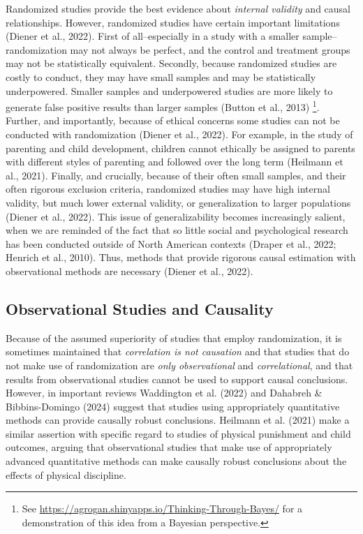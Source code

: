 \documentclass[
  letterpaper,
  DIV=11,
  numbers=noendperiod]{scrreprt}
\begin{document}
Randomized studies provide the best evidence about \emph{internal
validity} and causal relationships. However, randomized studies have
certain important limitations (Diener et al., 2022). First of
all--especially in a study with a smaller sample--randomization may not
always be perfect, and the control and treatment groups may not be
statistically equivalent. Secondly, because randomized studies are
costly to conduct, they may have small samples and may be statistically
underpowered. Smaller samples and underpowered studies are more likely
to generate false positive results than larger samples (Button et al.,
2013) \footnote{See
  \url{https://agrogan.shinyapps.io/Thinking-Through-Bayes/} for a
  demonstration of this idea from a Bayesian perspective.}. Further, and
importantly, because of ethical concerns some studies can not be
conducted with randomization (Diener et al., 2022). For example, in the
study of parenting and child development, children cannot ethically be
assigned to parents with different styles of parenting and followed over
the long term (Heilmann et al., 2021). Finally, and crucially, because
of their often small samples, and their often rigorous exclusion
criteria, randomized studies may have high internal validity, but much
lower external validity, or generalization to larger populations (Diener
et al., 2022). This issue of generalizability becomes increasingly
salient, when we are reminded of the fact that so little social and
psychological research has been conducted outside of North American
contexts (Draper et al., 2022; Henrich et al., 2010). Thus, methods that
provide rigorous causal estimation with observational methods are
necessary (Diener et al., 2022). 

\subsection{Observational Studies and
Causality}\label{observational-studies-and-causality}

Because of the assumed superiority of studies that employ randomization,
it is sometimes maintained that \emph{correlation is not causation} and
that studies that do not make use of randomization are \emph{only
observational} and \emph{correlational}, and that results from
observational studies cannot be used to support causal conclusions.
However, in important reviews Waddington et al. (2022) and Dahabreh \&
Bibbins-Domingo (2024) suggest that studies using appropriately
quantitative methods can provide causally robust conclusions. Heilmann
et al. (2021) make a similar assertion with specific regard to studies
of physical punishment and child outcomes, arguing that observational
studies that make use of appropriately advanced quantitative methods can
make causally robust conclusions about the effects of physical
discipline. 
\end{document}
